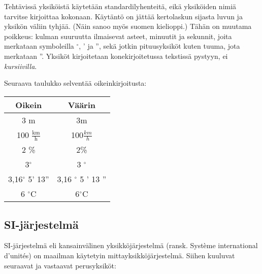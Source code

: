 
Tehtävissä yksiköistä käytetään standardilyhenteitä, eikä yksiköiden nimiä tarvitse kirjoittaa kokonaan. Käytäntö on jättää kertolaskun sijasta luvun ja yksikön väliin tyhjää. (Näin sanoo myös suomen kielioppi.) Tähän on muutama poikkeus: kulman suuruutta ilmaisevat asteet, minuutit ja sekunnit, joita merkataan symboleilla $^\circ$, ' ja '', sekä jotkin pituusyksiköt kuten tuuma, jota merkataan ''. Yksiköt kirjoitetaan konekirjoitetussa tekstissä pystyyn, ei \textit{kursiivilla}.




Seuraava taulukko selventää oikeinkirjoitusta:

\begin{center}
\begin{tabular}{c|c}
Oikein & Väärin \\
\hline
3 m & 3m 	\\
100 $\frac{\text{km}}{\text{h}}$ & 100$\frac{km}{h}$	\\
2 \% & 2\% 	\\
3$^\circ$ & 3 $^\circ$\\
3,16$^\circ$ 5' 13'' & 3,16 $^\circ$ 5 ' 13 '' 	\\
6 $^\circ$C & 6$^\circ$C 	\\
\end{tabular}
\end{center}


\subsection*{SI-järjestelmä}

SI-järjestelmä eli kansainvälinen yksikköjärjestelmä (ransk. Système international d'unités) on maailman käytetyin mittayksikköjärjestelmä. Siihen kuuluvat seuraavat  ja vastaavat perusyksiköt:


